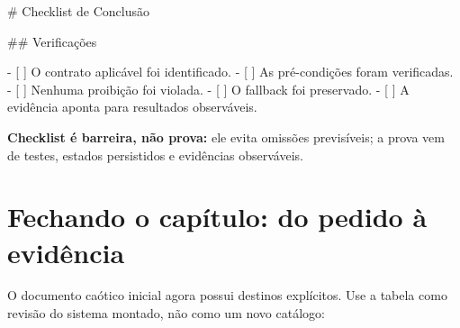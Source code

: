 \documentclass[
  10pt,
  a4paper,
  oneside]{book}
\newenvironment{Shaded}{}{}
\newcommand{\FunctionTok}[1]{\textcolor[rgb]{0.02,0.16,0.49}{#1}}
\newcommand{\NormalTok}[1]{#1}
\newcommand{\SpecialStringTok}[1]{\textcolor[rgb]{0.73,0.40,0.53}{#1}}
\newcommand{\VariableTok}[1]{\textcolor[rgb]{0.10,0.09,0.49}{#1}}
\begin{document}
\begin{Shaded}
\begin{Highlighting}[]
\FunctionTok{\# Checklist de Conclusão}

\FunctionTok{\#\# Verificações}

\SpecialStringTok{{-} }\VariableTok{[ ]}\NormalTok{ O contrato aplicável foi identificado.}
\SpecialStringTok{{-} }\VariableTok{[ ]}\NormalTok{ As pré{-}condições foram verificadas.}
\SpecialStringTok{{-} }\VariableTok{[ ]}\NormalTok{ Nenhuma proibição foi violada.}
\SpecialStringTok{{-} }\VariableTok{[ ]}\NormalTok{ O fallback foi preservado.}
\SpecialStringTok{{-} }\VariableTok{[ ]}\NormalTok{ A evidência aponta para resultados observáveis.}
\end{Highlighting}
\end{Shaded}

\textbf{Checklist é barreira, não prova:} ele evita omissões
previsíveis; a prova vem de testes, estados persistidos e evidências
observáveis.

\hypertarget{fechando-o-capuxedtulo-do-pedido-uxe0-eviduxeancia}{%
\section{Fechando o capítulo: do pedido à
evidência}\label{fechando-o-capuxedtulo-do-pedido-uxe0-eviduxeancia}}

O documento caótico inicial agora possui destinos explícitos. Use a
tabela como revisão do sistema montado, não como um novo catálogo:
\end{document}
